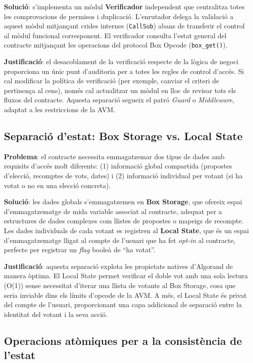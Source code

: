 \textbf{Solució}: s'implementa un mòdul \textbf{Verificador} independent que centralitza totes les comprovacions de permisos i duplicació. L'enrutador delega la validació a aquest mòdul mitjançant crides internes (\texttt{CallSub}) abans de transferir el control al mòdul funcional corresponent. El verificador consulta l'estat general del contracte mitjançant les operacions del protocol Box Opcode (\texttt{box\_get()}).

\textbf{Justificació}: el desacoblament de la verificació respecte de la lògica de negoci proporciona un únic punt d'auditoria per a totes les regles de control d'accés. Si cal modificar la política de verificació (per exemple, canviar el criteri de pertinença al cens), només cal actualitzar un mòdul en lloc de revisar tots els fluxos del contracte. Aquesta separació segueix el patró \textit{Guard} o \textit{Middleware}, adaptat a les restriccions de la AVM.
 
\subsection{Separació d'estat: Box Storage vs. Local State}
 
\textbf{Problema}: el contracte necessita emmagatzemar dos tipus de dades amb requisits d'accés molt diferents: (1) informació global compartida (propostes d'elecció, recomptes de vots, dates) i (2) informació individual per votant (si ha votat o no en una elecció concreta).
 
\textbf{Solució}: les dades globals s'emmagatzemen en \textbf{Box Storage}, que ofereix espai d'emmagatzematge de mida variable associat al contracte, adequat per a estructures de dades complexes com llistes de propostes o mapeigs de recompte. Les dades individuals de cada votant es registren al \textbf{Local State}, que és un espai d'emmagatzematge lligat al compte de l'usuari que ha fet \textit{opt-in} al contracte, perfecte per registrar un \textit{flag} booleà de ``ha votat''.
 
\textbf{Justificació}: aquesta separació explota les propietats natives d'Algorand de manera òptima. El Local State permet verificar el doble vot amb una sola lectura (O(1)) sense necessitat d'iterar una llista de votants al Box Storage, cosa que seria inviable dins els límits d'opcode de la AVM. A més, el Local State és privat del compte de l'usuari, proporcionant una capa addicional de separació entre la identitat del votant i la seva acció.

\subsection{Operacions atòmiques per a la consistència de l'estat}

